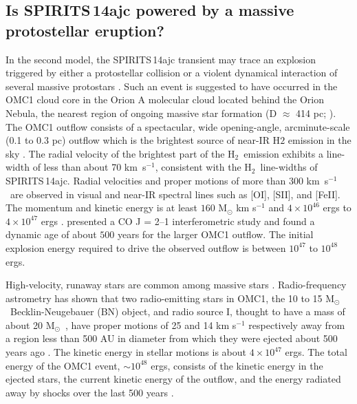 \documentclass[twocolumn,times]{aastex6}
\newcommand{\kms}{km~s{$^{-1}$}}
\newcommand{\hh}{H{$_2$}}
\newcommand{\Msol}{M$_{\odot}$}
\begin{document}
\subsection{Is SPIRITS\,14ajc powered by a massive protostellar eruption?}

In the second model, the SPIRITS\,14ajc  transient may trace an explosion triggered by
either a  protostellar collision or a violent  dynamical interaction of several massive
protostars \citep{ Davies2006,Dale2006}.     Such an event is 
suggested to have occurred in the OMC1 cloud core in the Orion A molecular cloud
located behind the Orion Nebula, the nearest region of ongoing massive star formation 
(D $\approx$ 414 pc; \citealt{Menten2007}).   The OMC1 outflow consists of a spectacular,  
wide opening-angle,  arcminute-scale (0.1 to 0.3 pc) outflow which is the brightest
source of near-IR H$2$ emission in the sky  \citep{AllenBurton93,Kaifu2000,
Zapata2009,Bally2011,BallyGinsburg2015}.   The radial velocity of the brightest part 
of the \hh\  emission exhibits a line-width of less than about 70 \kms , consistent with 
the \hh\ line-widths of SPIRITS\,14ajc.  Radial velocities and proper motions of more than 300
\kms\ are observed in visual and near-IR spectral lines such as [OI], [SII], and [FeII].  
The  momentum and kinetic  energy  is at least  
$160$ M$_{\odot}$ km s$^{-1}$ and  $4 \times 10^{46}$  ergs  \citep{Snell1984} to  
$4 \times 10^{47}$ ergs  \citep{KwanScoville1976}.     \citet{Zapata2009}  presented 
a CO J = 2--1 interferometric study and found a dynamic age of  about $500$ 
years for the larger OMC1 outflow.   The initial explosion energy required to drive
the observed outflow is between $10^{47}$ to  $10^{48}$ ergs.  

High-velocity, runaway stars are common among massive stars 
\citep{Hoogerwerf2000,Gualandris2004}.
Radio-frequency astrometry has shown that two radio-emitting stars in OMC1, 
the 10 to 15 \Msol\  Becklin-Neugebauer (BN) object, and radio source I, thought
to have a mass of about 20 \Msol\ \citep{Goddi2011},  have  proper motions  of 
25 and 14  km s$^{-1}$ respectively away from a region less than 500 AU in diameter 
from which they were ejected  about  500 years ago \citep{Rodriguez2005, 
Gomez2008,Goddi2011}.  The kinetic energy in stellar motions is about 
$4 \times 10^{47}$ ergs.   The total energy of the OMC1 event, $\sim 10^{48}$ ergs,
consists of the  kinetic energy in the ejected stars,  the current kinetic energy of the 
outflow, and  the energy radiated away by shocks over the last 500 years   
\citep{Bally2011}.
 
\end{document}
